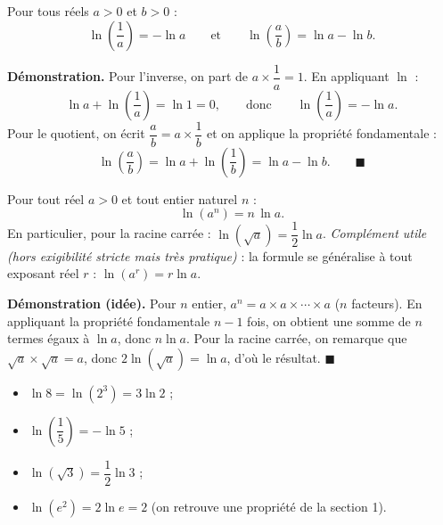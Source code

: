 \documentclass[11pt]{article}
\begin{document}
\begin{propriete}
Pour tous réels $a>0$ et $b>0$ :
\[ \ln\!\left(\frac{1}{a}\right)=-\ln a \qquad \text{et} \qquad \ln\!\left(\frac{a}{b}\right)=\ln a-\ln b. \]
\end{propriete}

\textbf{Démonstration.} Pour l'inverse, on part de $a\times\dfrac{1}{a}=1$. En appliquant $\ln$ :
\[ \ln a+\ln\!\left(\frac{1}{a}\right)=\ln 1=0, \qquad \text{donc} \qquad \ln\!\left(\frac{1}{a}\right)=-\ln a. \]
Pour le quotient, on écrit $\dfrac{a}{b}=a\times\dfrac{1}{b}$ et on applique la propriété fondamentale :
\[ \ln\!\left(\frac{a}{b}\right)=\ln a+\ln\!\left(\frac{1}{b}\right)=\ln a-\ln b. \qquad \blacksquare \]

\begin{propriete}
Pour tout réel $a>0$ et tout entier naturel $n$ :
\[ \ln(a^{n})=n\,\ln a. \]
En particulier, pour la racine carrée : $\ln(\sqrt{a})=\dfrac{1}{2}\ln a$.
\emph{Complément utile (hors exigibilité stricte mais très pratique)} : la formule se généralise à tout exposant réel $r$ : $\ln(a^{r})=r\ln a$.
\end{propriete}

\textbf{Démonstration (idée).} Pour $n$ entier, $a^{n}=a\times a\times\cdots\times a$ ($n$ facteurs). En appliquant la propriété fondamentale $n-1$ fois, on obtient une somme de $n$ termes égaux à $\ln a$, donc $n\ln a$. Pour la racine carrée, on remarque que $\sqrt{a}\times\sqrt{a}=a$, donc $2\ln(\sqrt{a})=\ln a$, d'où le résultat. $\blacksquare$

\begin{exemplebox}
\begin{itemize}
\item $\ln 8=\ln(2^{3})=3\ln 2$ ;
\item $\ln\!\left(\dfrac{1}{5}\right)=-\ln 5$ ;
\item $\ln(\sqrt{3})=\dfrac{1}{2}\ln 3$ ;
\item $\ln(e^{2})=2\ln e=2$ (on retrouve une propriété de la section 1).
\end{itemize}
\end{exemplebox}
\end{document}
